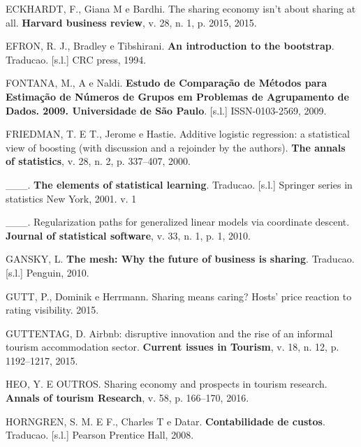 \documentclass[
	12pt,				%
	a4paper,		%
	oneside,    %
	chapter=TITLE,		   %
	section=TITLE,		   %
	subsection=TITLE,	   %
	subsubsection=TITLE, %
	english,			%
	french,				%
	spanish,			%
	brazil,				%
]{abntex2}
\begin{document}
\leavevmode\hypertarget{ref-eckhardt2015sharing}{}%
ECKHARDT, F., Giana M e Bardhi. The sharing economy isn't about sharing
at all. \textbf{Harvard business review}, v. 28, n. 1, p. 2015, 2015.

\leavevmode\hypertarget{ref-efron1994introduction}{}%
EFRON, R. J., Bradley e Tibshirani. \textbf{An introduction to the
bootstrap}. Traducao. {[}s.l.{]} CRC press, 1994.

\leavevmode\hypertarget{ref-fontanaestudo}{}%
FONTANA, M., A e Naldi. \textbf{Estudo de Comparação de Métodos para
Estimação de Números de Grupos em Problemas de Agrupamento de Dados.
2009. Universidade de São Paulo}. {[}s.l.{]} ISSN-0103-2569, 2009.

\leavevmode\hypertarget{ref-friedman2000additive}{}%
FRIEDMAN, T. E T., Jerome e Hastie. Additive logistic regression: a
statistical view of boosting (with discussion and a rejoinder by the
authors). \textbf{The annals of statistics}, v. 28, n. 2, p. 337--407,
2000.

\leavevmode\hypertarget{ref-friedman2001elements}{}%
\_\_\_. \textbf{The elements of statistical learning}. Traducao.
{[}s.l.{]} Springer series in statistics New York, 2001. v. 1

\leavevmode\hypertarget{ref-friedman2010regularization}{}%
\_\_\_. Regularization paths for generalized linear models via
coordinate descent. \textbf{Journal of statistical software}, v. 33, n.
1, p. 1, 2010.

\leavevmode\hypertarget{ref-gansky2010mesh}{}%
GANSKY, L. \textbf{The mesh: Why the future of business is sharing}.
Traducao. {[}s.l.{]} Penguin, 2010.

\leavevmode\hypertarget{ref-gutt2015sharing}{}%
GUTT, P., Dominik e Herrmann. Sharing means caring? Hosts' price
reaction to rating visibility. 2015.

\leavevmode\hypertarget{ref-guttentag2015airbnb}{}%
GUTTENTAG, D. Airbnb: disruptive innovation and the rise of an informal
tourism accommodation sector. \textbf{Current issues in Tourism}, v. 18,
n. 12, p. 1192--1217, 2015.

\leavevmode\hypertarget{ref-heo2016sharing}{}%
HEO, Y. E OUTROS. Sharing economy and prospects in tourism research.
\textbf{Annals of tourism Research}, v. 58, p. 166--170, 2016.

\leavevmode\hypertarget{ref-horngren2008contabilidade}{}%
HORNGREN, S. M. E F., Charles T e Datar. \textbf{Contabilidade de
custos}. Traducao. {[}s.l.{]} Pearson Prentice Hall, 2008.
\end{document}
